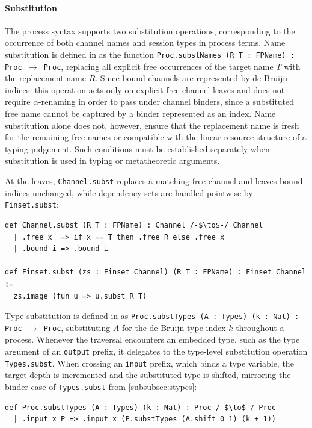 \paragraph{Substitution} The process syntax supports two substitution operations, corresponding to the occurrence of both channel names and session types in process terms. Name substitution is defined in  as the function \texttt{Proc.substNames (R T~: FPName)~: Proc $\to$ Proc}, replacing all explicit free occurrences of the target name $T$ with the replacement name $R$. Since bound channels are represented by de Bruijn indices, this operation acts only on explicit free channel leaves and does not require $\alpha$-renaming in order to pass under channel binders, since a substituted free name cannot be captured by a binder represented as an index. Name substitution alone does not, however, ensure that the replacement name is fresh for the remaining free names or compatible with the linear resource structure of a typing judgement. Such conditions must be established separately when substitution is used in typing or metatheoretic arguments.

At the leaves, \texttt{Channel.subst} replaces a matching free channel and leaves bound indices unchanged, while dependency sets are handled pointwise by \texttt{Finset.subst}:

\begin{lstlisting}[language=Lean4]
def Channel.subst (R T : FPName) : Channel /-$\to$-/ Channel
  | .free x  => if x == T then .free R else .free x
  | .bound i => .bound i

def Finset.subst (zs : Finset Channel) (R T : FPName) : Finset Channel :=
  zs.image (fun u => u.subst R T)
\end{lstlisting}

Type substitution is defined in  as \texttt{Proc.substTypes (A~: Types) (k~: Nat)~: Proc $\to$ Proc}, substituting $A$ for the de Bruijn type index $k$ throughout a process. Whenever the traversal encounters an embedded type, such as the type argument of an \texttt{output} prefix, it delegates to the type-level substitution operation \texttt{Types.subst}. When crossing an \texttt{input} prefix, which binds a type variable, the target depth is incremented and the substituted type is shifted, mirroring the binder case of \texttt{Types.subst} from \cref{subsubsec:stypes}:

\begin{lstlisting}[language=Lean4]
def Proc.substTypes (A : Types) (k : Nat) : Proc /-$\to$-/ Proc
  | .input x P => .input x (P.substTypes (A.shift 0 1) (k + 1))
\end{lstlisting}

